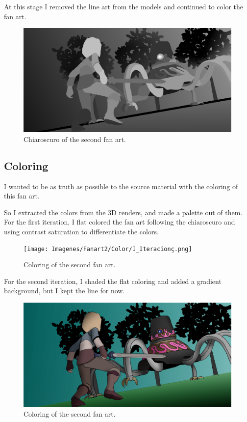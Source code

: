 \documentclass{cup-pan}
\begin{document}
        At this stage I removed the line art from the models and continued to color the fan art. 
        \begin{figure}[H]
            \includegraphics[width=\textwidth]{Imagenes/Fanart2/Claroscuro/IIII_Iteracion.png}
            \caption{Chiaroscuro of the second fan art.}
        \end{figure}

\newpage
    \subsection{Coloring}
        I wanted to be as truth as possible to the source material with the coloring of this fan art. 
        
        So I extracted the colors from the 3D renders, and made a palette out of them.\\

        For the first iteration, I flat colored the fan art following the chiaroscuro and using contrast saturation to differentiate the colors.\\
        \begin{figure}[H]
            \texttt{[image: Imagenes/Fanart2/Color/I\_Iteracionç.png]}
            \caption{Coloring of the second fan art.}
        \end{figure}

        For the second iteration, I shaded the flat coloring and added a gradient background, but I kept the line for now.\\
        \begin{figure}[H]
            \includegraphics[width=\textwidth]{Imagenes/Fanart2/Color/II_Iteracion.png}
            \caption{Coloring of the second fan art.}
        \end{figure}
\end{document}
